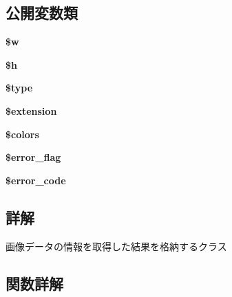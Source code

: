 \subsection*{公開変数類}
\begin{DoxyCompactItemize}
\item 
\hypertarget{class_image_info_result_a2ea8cb3d607b605672d33b3d7b600a4f}{}{\bfseries \$w}\label{class_image_info_result_a2ea8cb3d607b605672d33b3d7b600a4f}

\item 
\hypertarget{class_image_info_result_a9f434a13a1510793884fae7395adba0e}{}{\bfseries \$h}\label{class_image_info_result_a9f434a13a1510793884fae7395adba0e}

\item 
\hypertarget{class_image_info_result_a560e7851941e684528edd96fc5e48642}{}{\bfseries \$type}\label{class_image_info_result_a560e7851941e684528edd96fc5e48642}

\item 
\hypertarget{class_image_info_result_af23b27a45577e721edc690b2cbfba5ba}{}{\bfseries \$extension}\label{class_image_info_result_af23b27a45577e721edc690b2cbfba5ba}

\item 
\hypertarget{class_image_info_result_ae4bf606273ed7cbd6e2b765e98bac45e}{}{\bfseries \$colors}\label{class_image_info_result_ae4bf606273ed7cbd6e2b765e98bac45e}

\item 
\hypertarget{class_image_info_result_ae4b25982efeefff62f014d52a562315f}{}{\bfseries \$error\+\_\+flag}\label{class_image_info_result_ae4b25982efeefff62f014d52a562315f}

\item 
\hypertarget{class_image_info_result_a069bb950e4f88c1083434e81b652f790}{}{\bfseries \$error\+\_\+code}\label{class_image_info_result_a069bb950e4f88c1083434e81b652f790}

\end{DoxyCompactItemize}


\subsection{詳解}
画像データの情報を取得した結果を格納するクラス 

\subsection{関数詳解}
\hypertarget{class_image_info_result_acc470f70a838a91c9072c151f21190be}{}
